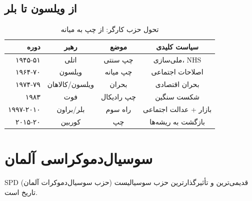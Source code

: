\subsection{از ویلسون تا بلر}

\begin{table}[htbp]
\centering
\caption{تحول حزب کارگر: از چپ به میانه}
\label{tab:labour-evolution}
\begin{tabular}{r|c|c|c}
\toprule
\textbf{دوره} & \textbf{رهبر} & \textbf{موضع} & \textbf{سیاست کلیدی} \\
\midrule
۱۹۴۵-۵۱ & اتلی & چپ سنتی & ملی‌سازی، NHS \\
۱۹۶۴-۷۰ & ویلسون & چپ میانه & اصلاحات اجتماعی \\
۱۹۷۴-۷۹ & ویلسون/کالاهان & بحران & بحران اقتصادی \\
۱۹۸۳ & فوت & چپ رادیکال & شکست سنگین \\
۱۹۹۷-۲۰۱۰ & بلر/براون & راه سوم & بازار + عدالت اجتماعی \\
۲۰۱۵-۲۰ & کوربین & چپ & بازگشت به ریشه‌ها \\
\bottomrule
\end{tabular}
\end{table}

\section{سوسیال‌دموکراسی آلمان}

SPD (حزب سوسیال‌دموکرات آلمان) قدیمی‌ترین و تأثیرگذارترین حزب سوسیالیست تاریخ است.

